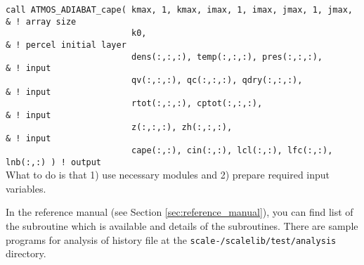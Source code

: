 {  \verb|call ATMOS_ADIABAT_cape( kmax, 1, kmax, imax, 1, imax, jmax, 1, jmax,      & ! array size|\\
  \verb|                         k0,                                               & ! percel initial layer|\\
  \verb|                         dens(:,:,:), temp(:,:,:), pres(:,:,:),            & ! input|\\
  \verb|                         qv(:,:,:), qc(:,:,:), qdry(:,:,:),                & ! input|\\
  \verb|                         rtot(:,:,:), cptot(:,:,:),                        & ! input|\\
  \verb|                         z(:,:,:), zh(:,:,:),                              & ! input|\\
  \verb|                         cape(:,:), cin(:,:), lcl(:,:), lfc(:,:), lnb(:,:) ) ! output|\\
}
What to do is that 1) use necessary modules and 2) prepare required input variables.


In the reference manual (see Section \ref{sec:reference_manual}), you can find list of the subroutine which is available and details of the subroutines.
There are sample programs for analysis of \scalerm history file at the \texttt{scale-\version/scalelib/test/analysis} directory.

